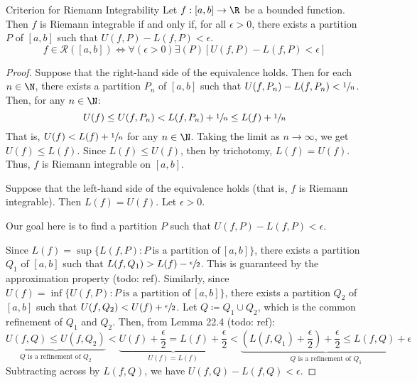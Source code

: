 \begin{lembox}{Criterion for Riemann Integrability}{}
    Let $f : [a,b] \to \R$ be a bounded function. Then $f$ is Riemann integrable if and only if, for all $\epsilon > 0$, there exists a partition $P$ of $[a,b]$ such that $U(f,P) - L(f,P) < \epsilon$.
    \[ f \in \mathcal{R}([a,b]) \iff \forall (\epsilon > 0) \exists (P) \left[ U(f,P) - L(f,P) < \epsilon \right] \]
    \tcblower
    \begin{proof}
        Suppose that the right-hand side of the equivalence holds. Then for each $n \in \N$, there exists a partition $P_n$ of $[a,b]$ such that $U(f, P_n) - L(f, P_n) < \sfrac{1}{n}$. Then, for any $n \in \N$:
        \[ U(f) \leq U(f, P_n) < L(f, P_n) + \sfrac{1}{n} \leq L(f) + \sfrac{1}{n} \]
        That is, $U(f) < L(f) + \sfrac{1}{n}$ for any $n \in \N$. Taking the limit as $n \to \infty$, we get $U(f) \leq L(f)$. Since $L(f) \leq U(f)$, then by trichotomy, $L(f) = U(f)$. Thus, $f$ is Riemann integrable on $[a,b]$.

        Suppose that the left-hand side of the equivalence holds (that is, $f$ is Riemann integrable). Then $L(f) = U(f)$. Let $\epsilon > 0$.

        \begin{notebox}
            Our goal here is to find a partition $P$ such that $U(f,P) - L(f,P) < \epsilon$.
        \end{notebox}

        Since $L(f) = \sup \{ L(f,P) : P\ \text{is a partition of}\ [a,b]\}$, there exists a partition $Q_1$ of $[a,b]$ such that $L(f,Q_1) > L(f) - \sfrac{\epsilon}{2}$. This is guaranteed by the approximation property (todo: ref). Similarly, since $U(f) = \inf \{ U(f,P) : P\ \text{is a partition of}\ [a,b] \}$, there exists a partition $Q_2$ of $[a,b]$  such that $U(f, Q_2) < U(f) + \sfrac{\epsilon}{2}$. Let $Q \coloneq Q_1 \cup Q_2$, which is the common refinement of $Q_1$ and $Q_2$. Then, from Lemma 22.4 (todo: ref):
        \[ \underbrace{U(f,Q) \leq U(f, Q_2)}_{\text{$Q$ is a refinement of $Q_2$}} < \underbrace{U(f) + \frac{\epsilon}{2} = L(f) + \frac{\epsilon}{2}}_{U(f) = L(f)} < \underbrace{\left( L(f, Q_1) + \frac{\epsilon}{2} \right) + \frac{\epsilon}{2} \leq L(f, Q) + \epsilon}_\text{$Q$ is a refinement of $Q_1$} \]
        Subtracting across by $L(f,Q)$, we have $U(f,Q) - L(f,Q) < \epsilon$.
    \end{proof}
\end{lembox}

